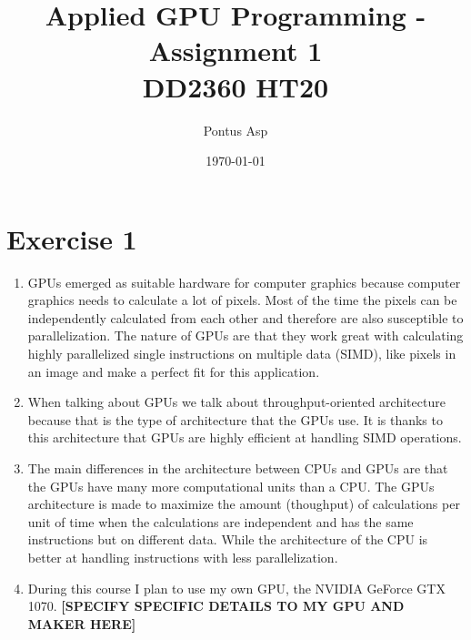 \documentclass[a4paper, 12pt]{article}
\begin{document}
\title{\vspace{4.0cm}Applied GPU Programming - Assignment 1\\
\large DD2360 HT20}
\author{Pontus Asp}
\date{\today}
\maketitle
\thispagestyle{empty}
\newpage

\tableofcontents
\newpage

\clearpage
{}

\section{Exercise 1}
\begin{enumerate}
	\item GPUs emerged as suitable hardware for computer graphics because computer graphics needs to calculate a lot of pixels. Most of the time the pixels can be independently calculated from each other and therefore are also susceptible to parallelization. The nature of GPUs are that they work great with calculating highly parallelized single instructions on multiple data (SIMD), like pixels in an image and make a perfect fit for this application.
	
	\item When talking about GPUs we talk about throughput-oriented architecture because that is the type of architecture that the GPUs use. It is thanks to this architecture that GPUs are highly efficient at handling SIMD operations.
	
	\item The main differences in the architecture between CPUs and GPUs are that the GPUs have many more computational units than a CPU. The GPUs architecture is made to maximize the amount (thoughput) of calculations per unit of time when the calculations are independent and has the same instructions but on different data. While the architecture of the CPU is better at handling instructions with less parallelization.
	
	\item During this course I plan to use my own GPU, the NVIDIA GeForce GTX 1070. \textbf{[SPECIFY SPECIFIC DETAILS TO MY GPU AND MAKER HERE]}
	

\end{enumerate}
\end{document}
